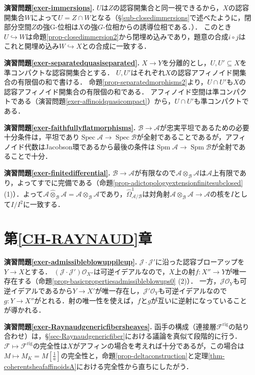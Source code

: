 \documentclass[a4paper,12pt, dvipdfmx]{jsbook}
\def\O{\mathscr{O}}
\def\rig{\mathop{\mathrm{rig}}\nolimits}
\def\Spec{\mathop{\mathrm{Spec}}\nolimits}
\def\Spm{\mathop{\mathrm{Spm}}\nolimits}
\theoremstyle{plain}
\theoremstyle{definition}
\begin{document}
{\medskip\noindent
{\bf 演習問題\ref{exer-immersions}.}
$U$は$Z$の認容開集合と同一視できるから，$X$の認容開集合$W$によって$U=Z\cap W$となる（\S\ref{sub-closedimmersions}で述べたように，閉部分空間$Z$の強G-位相は$X$の強$G$-位相からの誘導位相である．）．
このとき$U\hookrightarrow W$は命題\ref{prop-closedimmersion2}から閉埋め込みであり，題意の合成$i\circ j$はこれと開埋め込み$W\hookrightarrow X$との合成に一致する．

\medskip\noindent
{\bf 演習問題\ref{exer-separatedquasiseparated}.}
$X\rightarrow Y$を分離的とし，$U,U'\subseteq X$を準コンパクトな認容開集合とする．
$U,U'$はそれぞれ$X$の認容アフィノイド開集合の有限個の和で書ける．
命題\ref{prop-separatedmorphisms2}より，$U\cap U'$も$X$の認容アフィノイド開集合の有限個の和である．
アフィノイド空間は準コンパクトである（演習問題\ref{exer-affinoidquasicompact}）から，$U\cap U'$も準コンパクトである．

\medskip\noindent
{\bf 演習問題\ref{exer-faithfullyflatmorphisms}.}
$\mathcal{B}\rightarrow\mathcal{A}$が忠実平坦であるための必要十分条件は，平坦であり$\Spec\mathcal{A}\rightarrow\Spec\mathcal{B}$が全射であることであるが，アフィノイド代数はJacobson環であるから最後の条件は$\Spm\mathcal{A}\rightarrow\Spm\mathcal{B}$が全射であることで十分．

\medskip\noindent
{\bf 演習問題\ref{exer-finitedifferential}.}
$\mathcal{B}\rightarrow\mathcal{A}$が有限なので$\mathcal{A}\otimes_{\mathcal{B}}\mathcal{A}$は$\mathcal{A}$上有限であり，よってすでに完備である（命題\ref{prop-adictopologyextensionfinitesubclosed} (1)）．よって$\mathcal{A}\widehat{\otimes}_{\mathcal{B}}\mathcal{A}=\mathcal{A}\otimes_{\mathcal{B}}\mathcal{A}$であり，$\widehat{\Omega}^1_{\mathcal{A}/\mathcal{B}}$は対角射$\mathcal{A}\otimes_{\mathcal{B}}\mathcal{A}\rightarrow\mathcal{A}$の核を$I$として$I/I^2$に一致する．




\section*{第\ref{CH-RAYNAUD}章}

\noindent
{\bf 演習問題\ref{exer-admissibleblowuppileup}.}
$\mathscr{J}\cdot\mathscr{J}'$に沿った認容ブローアップを$Y\rightarrow X$とする．
$(\mathscr{J}\cdot\mathscr{J}')\O_{X''}$は可逆イデアルなので，$X$上の射$f\colon X''\rightarrow Y$が唯一存在する（命題\ref{prop-basicpropertiesadmissibleblowups0} (2)）．
一方，$\mathscr{J}\O_Y$も可逆イデアルであるから$Y\rightarrow X'$が唯一存在し，$\mathscr{J}'\O_Y$も可逆イデアルなので$g\colon Y\rightarrow X''$がとれる．射の唯一性を使えば，$f$と$g$が互いに逆射になっていることが導かれる．

\medskip\noindent
{\bf 演習問題\ref{exer-Raynaudgenericfibersheaves}.}
函手の構成（連接層$\mathscr{F}^{\rig}$の貼り合わせ）は，\S\ref{sec-Raynaudgenericfiber}における議論を真似て段階的に行う．
$\mathscr{F}\mapsto\mathscr{F}^{\rig}$の完全性は$X$がアフィンの場合を考えれば十分であるが，この場合は$M\mapsto M_K=M[\frac{1}{a}]$の完全性と，命題\ref{prop-deltaconstruction}と定理\ref{thm-coherentsheafaffinoidsA}における完全性から直ちにしたがう．



}
\end{document}
